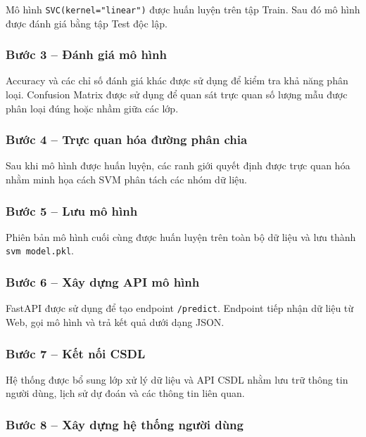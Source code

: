 \documentclass[14pt]{extarticle}
\begin{document}
	\noindent Mô hình \texttt{SVC(kernel="linear")} được huấn luyện trên tập Train. Sau đó mô hình được đánh giá bằng tập Test độc lập.
	
	\subsubsection*{Bước 3 -- Đánh giá mô hình}
	
	\noindent Accuracy và các chỉ số đánh giá khác được sử dụng để kiểm tra khả năng phân loại. Confusion Matrix được sử dụng để quan sát trực quan số lượng mẫu được phân loại đúng hoặc nhầm giữa các lớp.
	
	\subsubsection*{Bước 4 -- Trực quan hóa đường phân chia}
	
	\noindent Sau khi mô hình được huấn luyện, các ranh giới quyết định được trực quan hóa nhằm minh họa cách SVM phân tách các nhóm dữ liệu.
	
	\subsubsection*{Bước 5 -- Lưu mô hình}
	
	\noindent Phiên bản mô hình cuối cùng được huấn luyện trên toàn bộ dữ liệu và lưu thành \texttt{svm model.pkl}.
	
	\subsubsection*{Bước 6 -- Xây dựng API mô hình}
	
	\noindent FastAPI được sử dụng để tạo endpoint \texttt{/predict}. Endpoint tiếp nhận dữ liệu từ Web, gọi mô hình và trả kết quả dưới dạng JSON.
	
	\subsubsection*{Bước 7 -- Kết nối CSDL}
	
	\noindent Hệ thống được bổ sung lớp xử lý dữ liệu và API CSDL nhằm lưu trữ thông tin người dùng, lịch sử dự đoán và các thông tin liên quan.
	
	\subsubsection*{Bước 8 -- Xây dựng hệ thống người dùng}
	
\end{document}
